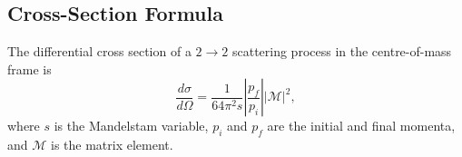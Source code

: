 \subsection{Cross-Section Formula}
\label{sec:APPENDIX_DERIVATIONS_CROSS_SECTION}

The differential cross section of a $2 \to 2$ scattering process in the centre-of-mass frame is
\begin{equation}
  \frac{d\sigma}{d\Omega} = \frac{1}{64\pi^2 s}\left|\frac{p_f}{p_i}\right||\mathcal{M}|^2,
  \label{eq:APPENDIX_CROSS_SECTION}
\end{equation}
where $s$ is the Mandelstam variable, $p_i$ and $p_f$ are the initial and final momenta, and $\mathcal{M}$ is the matrix element.
